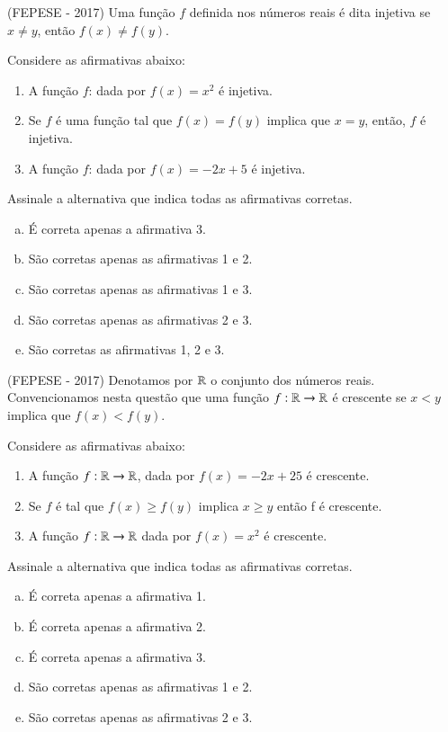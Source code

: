   \begin{exer}
  (FEPESE - 2017) Uma função $f$ definida nos números reais é dita injetiva se $x \neq y$, então $f(x) \neq f(y)$.

Considere as afirmativas abaixo:
\begin{enumerate}[1.]
 \item A função $f$:  dada por $f(x) = x^2$ é injetiva.

 \item Se $f$ é uma função tal que $f(x) = f(y)$ implica que $x = y$, então, $f$ é injetiva.

 \item A função $f$:  dada por $f(x) = -2x + 5$ é injetiva.
 \end{enumerate}
 Assinale a alternativa que indica todas as afirmativas corretas.
 \begin{enumerate}[a)]
 \item É correta apenas a afirmativa 3.
 \item São corretas apenas as afirmativas 1 e 2.
 \item São corretas apenas as afirmativas 1 e 3.
 \item São corretas apenas as afirmativas 2 e 3.
 \item São corretas as afirmativas 1, 2 e 3.
 \end{enumerate}
  \end{exer}
  
  \begin{exer}
  (FEPESE - 2017) Denotamos por $\mathbb{R}$ o conjunto dos números reais. Convencionamos nesta questão que uma função $f : \mathbb{R} \rightarrow \mathbb{R}$ é crescente se $x < y$ implica que $f(x) < f(y)$.

Considere as afirmativas abaixo:
\begin{enumerate}[1.]
\item A função $f:\mathbb{R} \rightarrow \mathbb{R}$, dada por $f(x) = -2x + 25$ é crescente.
\item Se $f$ é tal que $f(x) \geqslant f(y)$ implica $x \geqslant y$ então f é crescente.
\item A função $f: \mathbb{R} \rightarrow \mathbb{R}$ dada por $f(x) = x^2$  é crescente.
\end{enumerate}

Assinale a alternativa que indica todas as afirmativas corretas.

\begin{enumerate}[a)]
 \item É correta apenas a afirmativa 1.
 \item É correta apenas a afirmativa 2.
 \item É correta apenas a afirmativa 3.
 \item São corretas apenas as afirmativas 1 e 2.
 \item São corretas apenas as afirmativas 2 e 3.
\end{enumerate}
  \end{exer}
  
